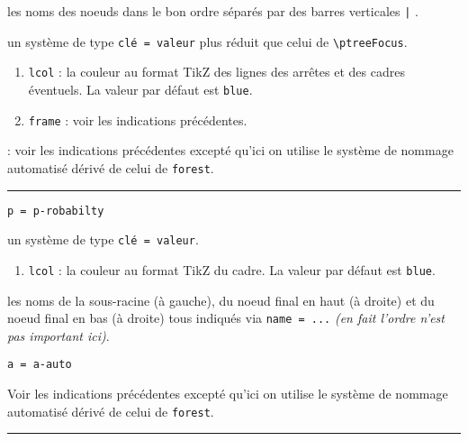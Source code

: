 \documentclass[12pt,a4paper]{article}
\theoremstyle{definition}
\newcommand\env[1]{\texttt{#1}}
\newcommand\macro[1]{\env{\textbackslash{}#1}}
\newcommand\separation{
    \medskip
    \hfill\rule{0.5\textwidth}{0.75pt}\hfill
    \medskip
}
\newcommand\extraspace{
    \vspace{0.25em}
}
\newcommand\mwhyprefix[2]{%
    \texttt{#1 = #1-#2}%
}
\begin{document}
\IDarg{} les noms des noeuds dans le bon ordre séparés par des barres verticales \verb#|# .


\bigskip



\IDoption{} un système de type \texttt{clé = valeur} plus réduit que celui de \macro{ptreeFocus}.

\begin{enumerate}    
    \item \verb#lcol# : la couleur au format TikZ des lignes des arrêtes et des cadres éventuels. La valeur par défaut est \verb#blue#.

    \extraspace
    
    \item \verb#frame# : voir les indications précédentes.
\end{enumerate}

\IDarg{} : voir les indications précédentes excepté qu'ici on utilise le système de nommage automatisé dérivé de celui de \verb#forest#.




\separation


 \hfill \mwhyprefix{p}{robabilty}

\IDoption{} un système de type \texttt{clé = valeur}.

\begin{enumerate}
    \item \verb#lcol# : la couleur au format TikZ du cadre. La valeur par défaut est \verb#blue#.
\end{enumerate}


 les noms de la sous-racine (à gauche), du noeud final en haut (à droite) et du noeud final en bas (à droite) tous indiqués via \verb#name = ...# \emph{(en fait l'ordre n'est pas important ici)}.


\bigskip


 \hfill \mwhyprefix{a}{auto}

\extraspace
\extraspace

Voir les indications précédentes excepté qu'ici on utilise le système de nommage automatisé dérivé de celui de \verb#forest#.





\separation


\end{document}
